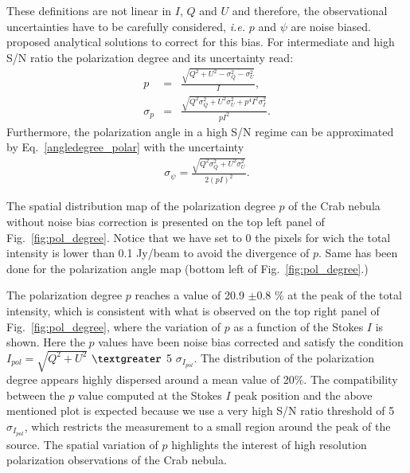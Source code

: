 \documentclass[twocolumn,traditabstract]{aa}
\begin{document}
These definitions are not linear in $I$, $Q$ and $U$ and therefore, the observational uncertainties have to be carefully considered, {\it i.e.} $p$ and $\psi$ are noise biased. 
\citet{1980A&A....91...97S,1985A&A...142..100S,montier} proposed analytical solutions to correct for this bias. For intermediate and high S/N ratio the polarization degree and its uncertainty read:
 \begin{eqnarray}
 p    &=& \frac{\sqrt{Q^2 + U^2 - \sigma_{Q}^2 - \sigma_{U}^2}}{I}, \nonumber \\ 
  \sigma_{p} &=& \frac{\sqrt{Q^2\sigma_Q^2 + U^2\sigma_U^2 + p^4I^2\sigma_I^2}}{pI^2}.
  \label{p_true_degree}
 \end{eqnarray}
 Furthermore, the polarization angle in a high S/N regime can be approximated by Eq.~\ref{angledegree_polar} with the uncertainty
  \begin{eqnarray}\label{angle_uncertainty}
  \sigma_{\psi} = \frac{\sqrt{Q^2\sigma_Q^2 + U^2\sigma_U^2}}{2(pI)^2}.
  \end{eqnarray}

The spatial distribution map of the polarization degree $p$ of the Crab nebula
without noise bias correction is presented on the top left panel of
Fig.~\ref{fig:pol_degree}. Notice that we have set to 0 the pixels for wich the total intensity is lower than 0.1 Jy/beam to avoid the divergence of $p$. Same has been done for the polarization angle map (bottom left of Fig.~\ref{fig:pol_degree}.)

The polarization degree $p$ reaches a value of 20.9 $\pm$0.8 \% at
the peak of the total intensity, which is consistent with what is observed on the
top right panel of Fig.~\ref{fig:pol_degree}, where the variation of $p$ as a
function of the Stokes $I$ is shown.  Here the $p$ values have been noise bias
corrected and satisfy the condition $I_{pol}=\sqrt{Q^2+U^2}$ $\textgreater$ 5
$\sigma_{I_{pol}}$. The distribution of the polarization degree appears highly
dispersed around a mean value of 20\%.  The compatibility between the $p$ value
computed at the Stokes $I$ peak position and the above mentioned plot is
expected because we use a very high S/N ratio threshold of 5 $\sigma_{I_{pol}}$,
which restricts the measurement to a small region around the peak of the source.
The spatial variation of $p$ highlights the interest of high resolution polarization
observations of the Crab nebula. 
\end{document}
